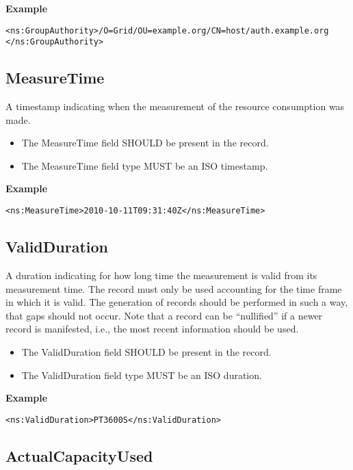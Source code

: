 {\bf Example}
\begin{verbatim}
<ns:GroupAuthority>/O=Grid/OU=example.org/CN=host/auth.example.org
</ns:GroupAuthority>
\end{verbatim}



\subsection{MeasureTime}

A timestamp indicating when the measurement of the resource consumption was
made.

\begin{itemize}
\item The MeasureTime field SHOULD be present in the record.
\item The MeasureTime field type MUST be an ISO timestamp.
\end{itemize}

{\bf Example}
\begin{verbatim}
<ns:MeasureTime>2010-10-11T09:31:40Z</ns:MeasureTime>
\end{verbatim}


\subsection{ValidDuration}

A duration indicating for how long time the measurement is valid from its
measurement time. The record must only be used accounting for the time frame in
which it is valid. The generation of records should be performed in such a way,
that gaps should not occur. Note that a record can be ``nullified'' if a newer
record is manifested, i.e., the most recent information should be used.

\begin{itemize}
\item The ValidDuration field SHOULD be present in the record.
\item The ValidDuration field type MUST be an ISO duration.
\end{itemize}

{\bf Example}
\begin{verbatim}
<ns:ValidDuration>PT3600S</ns:ValidDuration>
\end{verbatim}


\subsection{ActualCapacityUsed}

